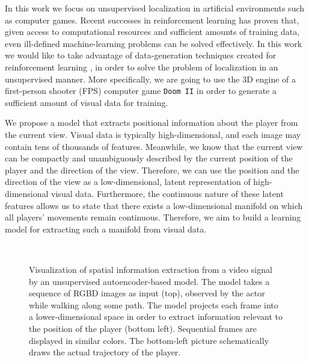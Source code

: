 In this work we focus on unsupervised localization in artificial environments such as computer games. Recent successes in reinforcement learning \cite{Silver, Lample2016} has proven that, given access to computational resources and sufficient amounts of training data, even ill-defined machine-learning problems can be solved effectively. In this work we would like to take advantage of data-generation techniques created for reinforcement learning \cite{Brockman2016, Kempka2016}, in order to solve the problem of localization in an unsupervised manner. More specifically, we are going to use the 3D engine of a first-person shooter (FPS) computer game \texttt{Doom II} in order to generate a sufficient amount of visual data for training.

We propose a model that extracts positional information about the player from the current view.
Visual data is typically high-dimensional, and each image may contain tens of thousands of features. Meanwhile, we know that the current view can be compactly and unambiguously described by the current position of the player and the direction of the view. Therefore, we can use the position and the direction of the view as a low-dimensional, latent representation of high-dimensional visual data. Furthermore, the continuous nature of these latent features allows us to state that there exists a low-dimensional manifold on which all players’ movements remain continuous. Therefore, we aim to build a learning model for extracting such a manifold from visual data.

\begin{figure}[t!]
	\centering
	\\
	\hfill
    	\caption{Visualization of spatial information extraction from a video signal by an unsupervised autoencoder-based model. The model takes a sequence of RGBD images as input (top), observed by the actor while walking along some path. The model projects each frame into a lower-dimensional space in order to extract information relevant to the position of the player (bottom left). Sequential frames are displayed in similar colors. The bottom-left picture schematically draws the actual trajectory of the player.}
    	\label{fig:intro_ex}
\end{figure}

